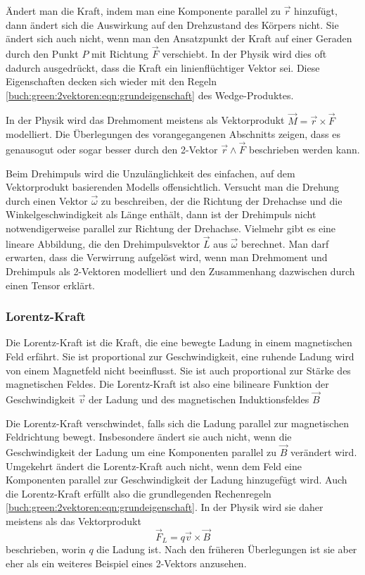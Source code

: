 Ändert man die Kraft, indem man eine Komponente parallel zu $\vec{r}$
hinzufügt, dann ändert sich die Auswirkung auf den Drehzustand des
Körpers nicht.
Sie ändert sich auch nicht, wenn man den Ansatzpunkt der Kraft
auf einer Geraden durch den Punkt $P$ mit Richtung $\vec{F}$
verschiebt.
In der Physik wird dies oft dadurch ausgedrückt, dass die Kraft
ein linienflüchtiger Vektor sei.
Diese Eigenschaften decken sich wieder mit den Regeln
\eqref{buch:green:2vektoren:eqn:grundeigenschaft}
des Wedge-Produktes.

In der Physik wird das Drehmoment meistens als Vektorprodukt
$\vec{M}=\vec{r}\times\vec{F}$ modelliert.
Die Überlegungen des vorangegangenen Abschnitts zeigen, dass
es genausogut oder sogar besser durch den 2-Vektor
$\vec{r}\wedge\vec{F}$ beschrieben werden kann.

Beim Drehimpuls wird die Unzulänglichkeit des einfachen, auf
dem Vektorprodukt basierenden Modells offensichtlich.
Versucht man die Drehung durch einen Vektor $\vec{\omega}$ zu
beschreiben, der die Richtung der Drehachse und die Winkelgeschwindigkeit
als Länge enthält, dann ist der Drehimpuls nicht notwendigerweise
parallel zur Richtung der Drehachse.
Vielmehr gibt es eine lineare Abbildung, die den Drehimpulsvektor
$\vec{L}$ aus $\vec{\omega}$ berechnet.
Man darf erwarten, dass die Verwirrung aufgelöst wird, wenn man
Drehmoment und Drehimpuls als 2-Vektoren modelliert und den Zusammenhang
dazwischen durch einen Tensor erklärt.

%
%
\subsubsection{Lorentz-Kraft}

Die Lorentz-Kraft ist die Kraft, die eine bewegte Ladung in einem
magnetischen Feld erfährt.
%
Sie ist proportional zur Geschwindigkeit, eine ruhende Ladung
wird von einem Magnetfeld nicht beeinflusst.
Sie ist auch proportional zur Stärke des magnetischen Feldes.
Die Lorentz-Kraft ist also eine bilineare Funktion der
Geschwindigkeit $\vec{v}$ der Ladung und des magnetischen
Induktionsfeldes $\vec{B}$

Die Lorentz-Kraft verschwindet, falls sich die Ladung parallel zur
magnetischen Feldrichtung bewegt.
Insbesondere ändert sie auch nicht, wenn die Geschwindigkeit der
Ladung um eine Komponenten parallel zu $\vec{B}$ verändert wird.
Umgekehrt ändert die Lorentz-Kraft auch nicht, wenn dem Feld
eine Komponenten parallel zur Geschwindigkeit der Ladung hinzugefügt
wird.
Auch die Lorentz-Kraft erfüllt also die grundlegenden
Rechenregeln \eqref{buch:green:2vektoren:eqn:grundeigenschaft}.
In der Physik wird sie daher meistens als das Vektorprodukt
\[
\vec{F}_L
=
q\vec{v}\times \vec{B}
\]
beschrieben, worin $q$ die Ladung ist.
Nach den früheren Überlegungen ist sie aber eher als ein weiteres
Beispiel eines 2-Vektors anzusehen.

